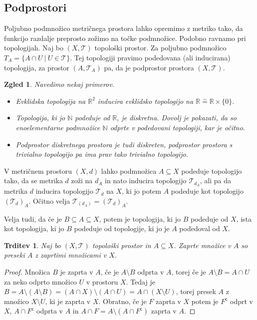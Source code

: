 \documentclass[10pt, a4paper]{article}
\newtheorem{trditev}[izr]{Trditev}
\newtheorem{zgled}{Zgled}[section]
\newenvironment{noticeC}{%
  \tcolorbox[%
  notitle,
  empty,
  enhanced,  %
  breakable,
  coltext=black, 
  fontupper=\rmfamily,
  parbox=false,
  noparskip,
  sharp corners,
  boxrule=-1pt,  %
  frame hidden,
  left=7pt,  %
  right=7pt,
  top=5pt,
  bottom=5pt,
  before skip=2.5ex plus 2pt,
  after skip=2.5ex plus 2pt,
  overlay unbroken and last={%
  },
  ]}
{\endtcolorbox}
\newenvironment{dokaz}%
  {\begin{noticeC}\begin{proof}}%
  {\end{proof}\end{noticeC}}
\newcommand{\stcomp}[1]{{#1}^{\mathsf{c}}}
\newcommand{\N}{\mathbb {N}}
\newcommand{\R}{\mathbb {R}}
\newcommand{\topo}[1]{\mathcal{#1}}
\begin{document}
\subsection{Podprostori}

Poljubno podmnožico metričnega prostora lahko opremimo z metriko tako, da funkcijo razdalje preprosto zožimo na točke podmnožice.
Podobno ravnamo pri topologijah. Naj bo $(X, \topo{T})$ topološki prostor.
Za poljubno podmnožico $T_A = \{A \cap U\ |\ U \in \topo{T}\}$.
Tej topologiji pravimo podedovana (ali inducirana) topologija, za prostor $(A, \topo{T}_A)$ pa,
da je podprostor prostora $(X, \topo{T})$.

\begin{zgled}
  Navedimo nekaj primerov.
  \begin{itemize}
    \item Evklidska topologija na $\R^2$ inducira evklidsko topologijo na $\R \stackrel{\sim}{=} \R \times \{0\}.$
    \item Topologija, ki jo $\N$ podeduje od $\R$, je diskretna. Dovolj je pokazati, da so enoelementarne podmnožice
    $\N$ odprte v podedovani topologiji, kar je očitno.
    \item Podprostor diskretnega prostora je tudi diskreten, podprostor prostora s trivialno topologijo pa ima 
    prav tako trivialno topologijo.
  \end{itemize}
\end{zgled}

V metričnem prostoru $(X, d)$ lahko podmnožica $A \subseteq X$ podeduje topologijo tako, da se metrika $d$ zoži na $d_A$ in 
nato inducira topologijo $\topo{T}_{d_A}$, ali pa da metrika $d$ inducira topologijo $\topo{T}_d$ na $X$, ki jo potem $A$ podeduje kot topologijo $(\topo{T}_d)_A$.
Očitno velja $\topo{T}_{(d_A)} = (\topo{T}_d)_A$.

Velja tudi, da če je $B \subseteq A \subseteq X$, potem je topologija, ki jo $B$ podeduje od $X$, ista kot topologija,
ki jo $B$ podeduje od topologije, ki jo je $A$ podedoval od $X$.

\begin{trditev}
  Naj bo $(X, \topo{T})$ topološki prostor in $A \subseteq X$.
  Zaprte množice v $A$ so preseki $A$ z zaprtimi množicami v $X$.
\end{trditev}

\begin{dokaz}
  Množica $B$ je zaprta v $A$, če je $A \setminus B$ odprta v $A$, torej če je $A \setminus B = A \cap U$
  za neko odprto množico $U$ v prostoru $X$.
  Tedaj je $B = A \setminus (A \setminus B) = (A \cap X) \setminus (A \cap U) = A \cap (X \setminus U)$, torej presek $A$ z množico $X \setminus U$,
  ki je zaprta v $X$. Obratno, če je $F$ zaprta v $X$ potem je $\stcomp{F}$ odprt v $X$,
  $A \cap \stcomp{F}$ odprta v $A$ in $A \cap F = A \setminus (A \cap \stcomp{F})$ zaprta v $A$.
\end{dokaz}
\end{document}
